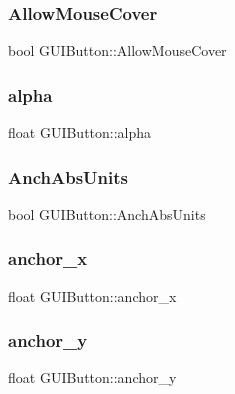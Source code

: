 \subsubsection{\texorpdfstring{Allow\+Mouse\+Cover}{AllowMouseCover}}
{\footnotesize\ttfamily bool G\+U\+I\+Button\+::\+Allow\+Mouse\+Cover}

\hypertarget{class_g_u_i_button_a075acd0f481655652b551e62db83e0b4}{}\label{class_g_u_i_button_a075acd0f481655652b551e62db83e0b4} 
\subsubsection{\texorpdfstring{alpha}{alpha}}
{\footnotesize\ttfamily float G\+U\+I\+Button\+::alpha}

\hypertarget{class_g_u_i_button_aed8fb11e67fb9a9a78b8c962d37c7999}{}\label{class_g_u_i_button_aed8fb11e67fb9a9a78b8c962d37c7999} 
\subsubsection{\texorpdfstring{Anch\+Abs\+Units}{AnchAbsUnits}}
{\footnotesize\ttfamily bool G\+U\+I\+Button\+::\+Anch\+Abs\+Units}

\hypertarget{class_g_u_i_button_a4f929d11130706a367414b94d2dd61a1}{}\label{class_g_u_i_button_a4f929d11130706a367414b94d2dd61a1} 
\subsubsection{\texorpdfstring{anchor\+\_\+x}{anchor\_x}}
{\footnotesize\ttfamily float G\+U\+I\+Button\+::anchor\+\_\+x}

\hypertarget{class_g_u_i_button_a95842d4f660e134ad7060f3d8939b173}{}\label{class_g_u_i_button_a95842d4f660e134ad7060f3d8939b173} 
\subsubsection{\texorpdfstring{anchor\+\_\+y}{anchor\_y}}
{\footnotesize\ttfamily float G\+U\+I\+Button\+::anchor\+\_\+y}

